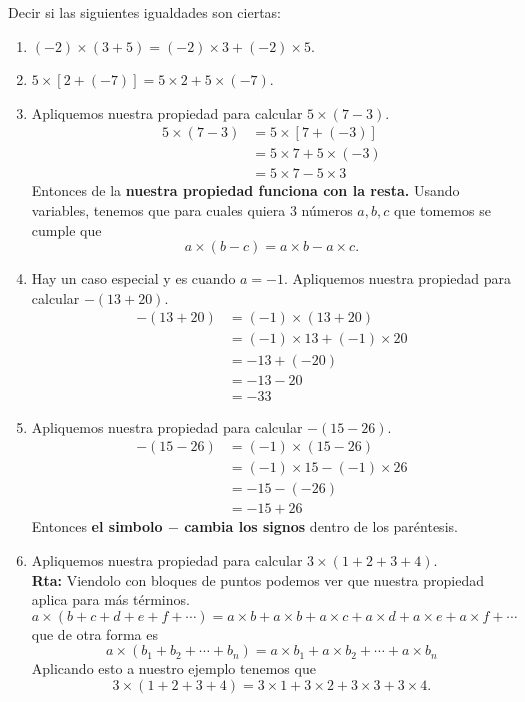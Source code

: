 \begin{ejemplo}
		Decir si las siguientes igualdades son ciertas:
		\begin{enumerate}[label=\Alph*)]
				\item $(-2)\times (3+5)=(-2)\times 3 + (-2)\times 5$.
				
				\item $5\times \left[2+(-7)\right]=5\times 2 + 5\times (-7)$.		
				
				\item Apliquemos nuestra propiedad para calcular $5\times (7-3)$.
						\begin{align*}
						5\times (7-3) &= 5\times \left[7+(-3)\right]\\
						&= 5\times 7 + 5\times (-3)\\
						&= 5\times 7 - 5\times 3
						\end{align*}
						Entonces de la \textbf{nuestra propiedad funciona con la resta.} Usando variables, tenemos que para cuales quiera 3 números $a,b,c$ que tomemos se cumple que
						\[
						a\times(b-c) = a\times b - a\times c.
						\]
				
				\item Hay un caso especial y es cuando $a=-1$. Apliquemos nuestra propiedad para calcular $-(13+20)$.
						\begin{align*}
						-(13+20) &= (-1)\times (13+20)\\
						&= (-1)\times 13 + (-1)\times 20\\
						&= -13+(-20)\\
						&= -13-20\\
						&=-33
						\end{align*}
				
				\item Apliquemos nuestra propiedad para calcular $-(15-26)$.
						\begin{align*}
						-(15-26) &= (-1)\times (15-26)\\
										&= (-1)\times 15 - (-1)\times 26\\
										&= -15-(-26)\\
										&= -15+26
						\end{align*}
						Entonces \textbf{el simbolo $-$ cambia los signos} dentro de los paréntesis.
				
				\item Apliquemos nuestra propiedad para calcular $3\times (1+2+3+4)$.\\
				\textbf{Rta: }Viendolo con bloques de puntos podemos ver que nuestra propiedad aplica para más términos.
				\[
				a\times(b+c+d+e+f+\cdots) = a\times b + a\times b +a\times c+a\times d +a\times e+a\times f+\cdots  \]
				que de otra forma es 
				\[
				a\times(b_1+b_2+\cdots+b_n) = a\times b_1 + a\times b_2 +\cdots +a\times b_n  \]
				Aplicando esto a nuestro ejemplo tenemos que 
				\[
						3\times (1+2+3+4)=3\times 1+3\times 2+3\times 3+3\times 4.
				\]
		\end{enumerate}
\end{ejemplo}

